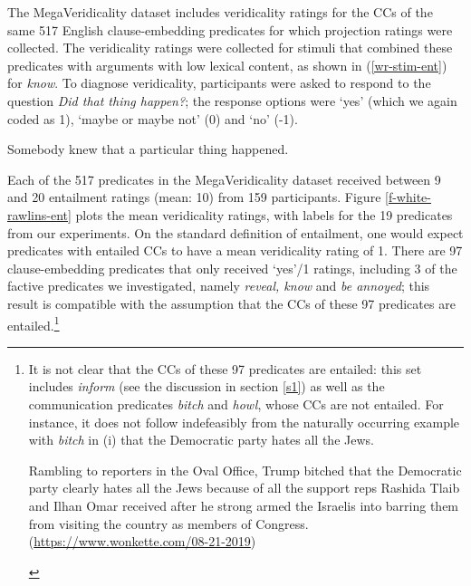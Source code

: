 \documentclass[11pt,fleqn]{article}
\newcommand{\6}{\mbox{$[\hspace*{-.6mm}[$}}
\newcommand{\9}{\mbox{$]\hspace*{-.6mm}]$}}
\begin{document}
The MegaVeridicality dataset includes veridicality ratings for the CCs of the same 517 English clause-embedding predicates for which projection ratings were collected. The veridicality ratings were collected for stimuli that combined these predicates with arguments with low lexical content, as shown in (\ref{wr-stim-ent}) for {\em know}. To diagnose veridicality, participants were asked to respond to the question {\em Did that thing happen?}; the response options were `yes' (which we again coded as 1), `maybe or maybe not' (0) and `no' (-1).

\begin{exe}
\ex\label{wr-stim-ent} Somebody knew that a particular thing happened.
\end{exe}

Each of the 517 predicates in the MegaVeridicality dataset received between 9 and 20 entailment ratings (mean: 10) from 159 participants. Figure \ref{f-white-rawlins-ent} plots the mean veridicality ratings, with labels for the 19 predicates from our experiments. On the standard definition of entailment, one would expect predicates with entailed CCs to have a mean veridicality rating of 1. There are 97 clause-embedding predicates that only received `yes'/1 ratings, including 3 of the factive predicates we investigated, namely {\em reveal, know} and {\em be annoyed}; this result is compatible with the assumption that the CCs of these 97 predicates are entailed.\footnote{\label{mv}It is not clear that the CCs of these 97 predicates are entailed: this set includes {\em inform} (see the discussion in section \ref{s1}) as well as the communication predicates {\em bitch} and {\em howl}, whose CCs are not entailed. 
For instance, it does not follow indefeasibly from the naturally occurring example with {\em bitch} in (i) that the Democratic party hates all the Jews.
\begin{exe}
 Rambling to reporters in the Oval Office, Trump bitched that the Democratic party clearly hates all the Jews because of all the support reps Rashida Tlaib and Ilhan Omar received after he strong armed the Israelis into barring them from visiting the country as members of Congress. (\url{https://www.wonkette.com/08-21-2019})
\end{exe}
}
\end{document}
